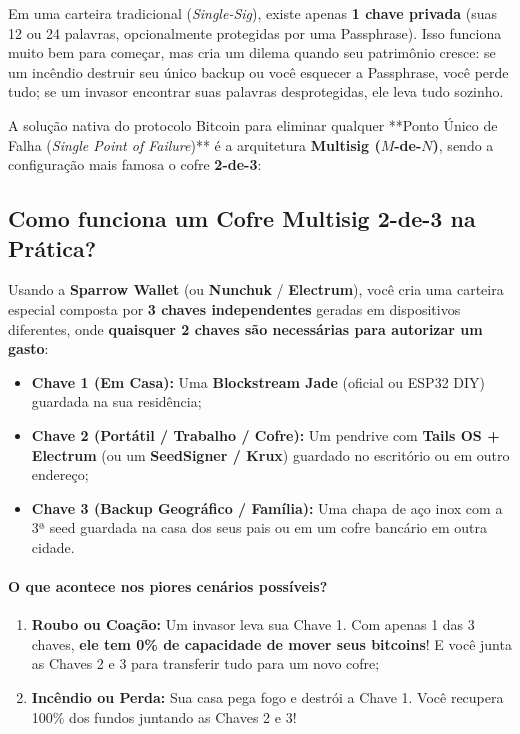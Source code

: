 \documentclass{pousadaguide}
\begin{document}
Em uma carteira tradicional (\emph{Single-Sig}), existe apenas \textbf{1 chave privada} (suas 12 ou 24 palavras, opcionalmente protegidas por uma Passphrase). Isso funciona muito bem para começar, mas cria um dilema quando seu patrimônio cresce: se um incêndio destruir seu único backup ou você esquecer a Passphrase, você perde tudo; se um invasor encontrar suas palavras desprotegidas, ele leva tudo sozinho.

A solução nativa do protocolo Bitcoin para eliminar qualquer **Ponto Único de Falha (\emph{Single Point of Failure})** é a arquitetura \textbf{Multisig ($M$-de-$N$)}, sendo a configuração mais famosa o cofre \textbf{2-de-3}:

\subsection{Como funciona um Cofre Multisig 2-de-3 na Prática?}

Usando a \textbf{Sparrow Wallet} (ou \textbf{Nunchuk} / \textbf{Electrum}), você cria uma carteira especial composta por \textbf{3 chaves independentes} geradas em dispositivos diferentes, onde \textbf{quaisquer 2 chaves são necessárias para autorizar um gasto}:

\begin{itemize}
  \item \textbf{Chave 1 (Em Casa):} Uma \textbf{Blockstream Jade} (oficial ou ESP32 DIY) guardada na sua residência;
  \item \textbf{Chave 2 (Portátil / Trabalho / Cofre):} Um pendrive com \textbf{Tails OS + Electrum} (ou um \textbf{SeedSigner / Krux}) guardado no escritório ou em outro endereço;
  \item \textbf{Chave 3 (Backup Geográfico / Família):} Uma chapa de aço inox com a 3ª seed guardada na casa dos seus pais ou em um cofre bancário em outra cidade.
\end{itemize}

\paragraph{O que acontece nos piores cenários possíveis?}
\begin{enumerate}
  \item \textbf{Roubo ou Coação:} Um invasor leva sua Chave 1. Com apenas 1 das 3 chaves, \textbf{ele tem 0\% de capacidade de mover seus bitcoins}! E você junta as Chaves 2 e 3 para transferir tudo para um novo cofre;
  \item \textbf{Incêndio ou Perda:} Sua casa pega fogo e destrói a Chave 1. Você recupera 100\% dos fundos juntando as Chaves 2 e 3!
\end{enumerate}
\end{document}
